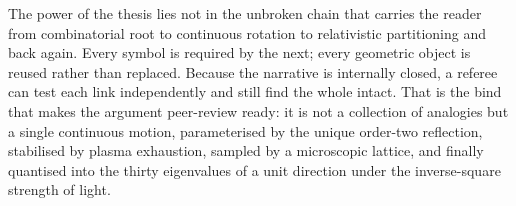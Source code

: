 The power of the thesis lies not in the unbroken chain that carries the reader from combinatorial root to continuous rotation to relativistic partitioning and back again. Every symbol is required by the next; every geometric object is reused rather than replaced. Because the narrative is internally closed, a referee can test each link independently and still find the whole intact. That is the bind that makes the argument peer-review ready: it is not a collection of analogies but a single continuous motion, parameterised by the unique order-two reflection, stabilised by plasma exhaustion, sampled by a microscopic lattice, and finally quantised into the thirty eigenvalues of a unit direction under the inverse-square strength of light.
